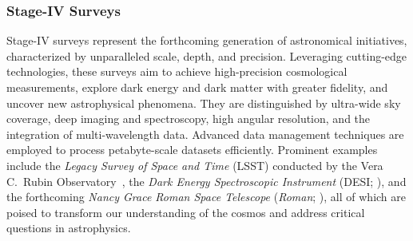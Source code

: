 \subsubsection{Stage-IV Surveys}
Stage-IV surveys represent the forthcoming generation of astronomical initiatives, characterized by unparalleled scale, depth, and precision. Leveraging cutting-edge technologies, these surveys aim to achieve high-precision cosmological measurements, explore dark energy and dark matter with greater fidelity, and uncover new astrophysical phenomena. They are distinguished by ultra-wide sky coverage, deep imaging and spectroscopy, high angular resolution, and the integration of multi-wavelength data. Advanced data management techniques are employed to process petabyte-scale datasets efficiently. Prominent examples include the \emph{Legacy Survey of Space and Time} (LSST) conducted by the Vera C.\ Rubin Observatory~\cite{2019ApJ...873..111I}, the \emph{Dark Energy Spectroscopic Instrument} (DESI; \citealt{2016arXiv161100036D}), and the forthcoming \emph{Nancy Grace Roman Space Telescope} (\emph{Roman}; \citealt{2015arXiv150303757S}), all of which are poised to transform our understanding of the cosmos and address critical questions in astrophysics.
